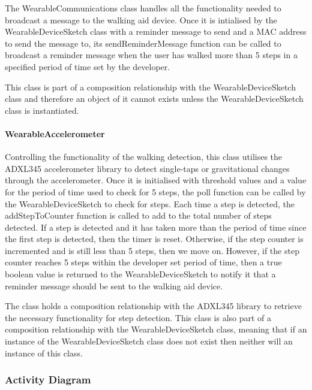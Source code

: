                     The WearableCommunications class handles all the functionality needed to broadcast a message to the walking aid device. Once it is intialised by the WearableDeviceSketch class with a reminder message to send and a MAC address to send the message to, its sendReminderMessage function can be called to broadcast a reminder message when the user has walked more than 5 steps in a specified period of time set by the developer.

                    This class is part of a composition relationship with the WearableDeviceSketch class and therefore an object of it cannot exists unless the WearableDeviceSketch class is instantiated.

                \paragraph{WearableAccelerometer}\mbox{}

                    Controlling the functionality of the walking detection, this class utilises the ADXL345 accelerometer library to detect single-taps or gravitational changes through the accelerometer. Once it is initialised with threshold values and a value for the period of time used to check for 5 steps, the poll function can be called by the WearableDeviceSketch to check for steps. Each time a step is detected, the addStepToCounter function is called to add to the total number of steps detected. If a step is detected and it has taken more than the period of time since the first step is detected, then the timer is reset. Otherwise, if the step counter is incremented and is still less than 5 steps, then we move on. However, if the step counter reaches 5 steps within the developer set period of time, then a true boolean value is returned to the WearableDeviceSketch to notify it that a reminder message should be sent to the walking aid device.

                    The class holds a composition relationship with the ADXL345 library to retrieve the necessary functionality for step detection. This class is also part of a composition relationship with the WearableDeviceSketch class, meaning that if an instance of the WearableDeviceSketch class does not exist then neither will an instance of this class. 

                \newpage

            \subsubsection{Activity Diagram}
            \label{subsubsec:wearable_activity}

